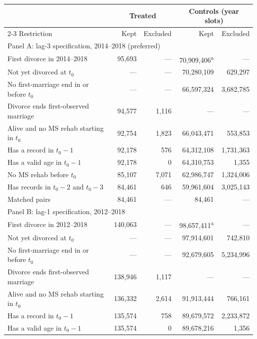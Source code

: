 \documentclass[a4paper,12pt]{article}
\theoremstyle{plain}
\theoremstyle{definition}
\theoremstyle{TheoremNum}
\theoremstyle{CorollaryNum}
\theoremstyle{PropositionNum}
\theoremstyle{TheoremNum}
\begin{document}
\begin{table}[H]
\centering
\footnotesize
\setlength{\tabcolsep}{3pt}
\renewcommand{\arraystretch}{1.12}
\begin{tabular*}{\textwidth}{@{}p{}@{\extracolsep{\fill}}rrrr@{}}
\hline
& \multicolumn{2}{c}{Treated}
& \multicolumn{2}{c}{Controls (year slots)} \\
\cline{2-3}\cline{4-5}
Restriction & Kept & Excluded & Kept & Excluded \\
\hline
\multicolumn{5}{l}{Panel A: lag-3 specification, 2014--2018 (preferred)} \\ \hline
First divorce in 2014--2018
& 95,693 & --- & 70,909,406\textsuperscript{a} & --- \\
Not yet divorced at $t_0$
& --- & --- & 70,280,109 & 629,297 \\
No first-marriage end in or before $t_0$
& --- & --- & 66,597,324 & 3,682,785 \\
Divorce ends first-observed marriage
& 94,577 & 1,116 & --- & --- \\
Alive and no MS rehab starting in $t_0$
& 92,754 & 1,823 & 66,043,471 & 553,853 \\
Has a record in $t_0-1$
& 92,178 & 576 & 64,312,108 & 1,731,363 \\
Has a valid age in $t_0-1$
& 92,178 & 0 & 64,310,753 & 1,355 \\
No MS rehab before $t_0$
& 85,107 & 7,071 & 62,986,747 & 1,324,006 \\
Has records in $t_0-2$ and $t_0-3$
& 84,461 & 646 & 59,961,604 & 3,025,143 \\
Matched pairs
& 84,461 & --- & 84,461 & --- \\
\hline
\multicolumn{5}{l}{Panel B: lag-1 specification, 2012--2018} \\ \hline
First divorce in 2012--2018
& 140,063 & --- & 98,657,411\textsuperscript{a} & --- \\
Not yet divorced at $t_0$
& --- & --- & 97,914,601 & 742,810 \\
No first-marriage end in or before $t_0$
& --- & --- & 92,679,605 & 5,234,996 \\
Divorce ends first-observed marriage
& 138,946 & 1,117 & --- & --- \\
Alive and no MS rehab starting in $t_0$
& 136,332 & 2,614 & 91,913,444 & 766,161 \\
Has a record in $t_0-1$
& 135,574 & 758 & 89,679,572 & 2,233,872 \\
Has a valid age in $t_0-1$
& 135,574 & 0 & 89,678,216 & 1,356 \\

\end{tabular*}
\end{table}
\end{document}
